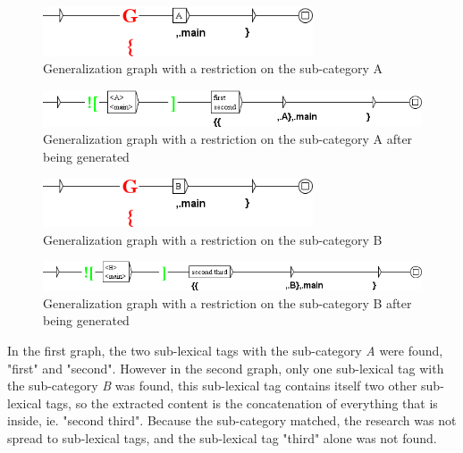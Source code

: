 \begin{figure}[!htb]
  \centering
  \includegraphics[width=8cm]{resources/img/graphe_restriction_A.png}
  \caption{Generalization graph with a restriction on the sub-category A}
  \label{fig:graphe_restriction_A}
\end{figure}

\begin{figure}[!htb]
  \centering
  \includegraphics[width=14cm]{resources/img/graphe_restriction_A_genere.png}
  \caption{Generalization graph with a restriction on the sub-category A after being generated}
  \label{fig:graphe_restriction_A_genere}
\end{figure}

\begin{figure}[!htb]
  \centering
  \includegraphics[width=8cm]{resources/img/graphe_restriction_B.png}
  \caption{Generalization graph with a restriction on the sub-category B}
  \label{fig:graphe_restriction_B}
\end{figure}

\begin{figure}[!htb]
  \centering
  \includegraphics[width=14cm]{resources/img/graphe_restriction_B_genere.png}
  \caption{Generalization graph with a restriction on the sub-category B after being generated}
  \label{fig:graphe_restriction_B_genere}
\end{figure}

\bigskip
In the first graph, the two sub-lexical tags with the sub-category \textit{A} were found, "first" and "second". However in the second graph, only one sub-lexical tag with the sub-category \textit{B} was found, this sub-lexical tag contains itself two other sub-lexical tags, so the extracted content is the concatenation of everything that is inside, ie. "second third". Because the sub-category matched, the research was not spread to sub-lexical tags, and the sub-lexical tag "third" alone was not found.


